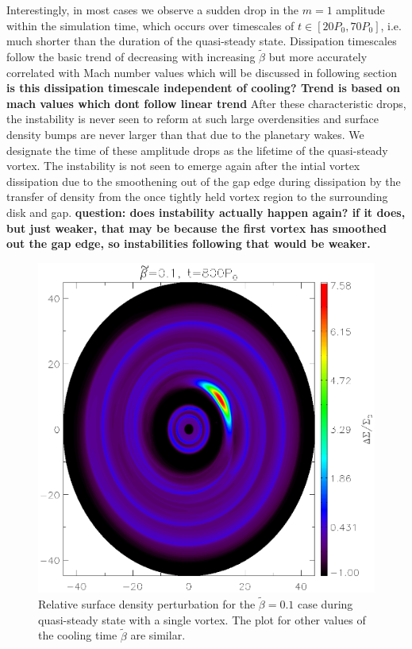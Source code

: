 Interestingly, in most cases we observe a sudden drop in 
the $m=1$ amplitude within the simulation time, which occurs over
timescales of $t\in[20P_0,70P_0]$, i.e. much shorter than the duration of the
quasi-steady state. Dissipation timescales follow the basic trend of decreasing with increasing $\tilde\beta$ but more accurately correlated with Mach number values which will be discussed in following section
{\bf is this dissipation timescale independent of cooling? Trend is based on mach values which dont follow linear trend } 
After these characteristic drops, the instability is never seen to
reform at such large overdensities and surface density bumps are never larger
than that due to the planetary wakes. We designate the time of these
amplitude drops as the lifetime 
of the quasi-steady vortex.
The instability is not seen to emerge again after the intial vortex dissipation
 due to the smoothening out of the gap edge during dissipation by the
 transfer of density from the once tightly held vortex region to the surrounding
 disk and gap.  
{\bf question: does instability
  actually happen again? if it does, but just weaker, that may be
  because the first vortex has smoothed out the gap edge, so
  instabilities following that would be weaker.}



\begin{figure}
  \includegraphics[width=\linewidth,height=\linewidth]{figures/vortex2D}
  \caption{Relative surface density perturbation for the
    $\tilde\beta=0.1$ case during quasi-steady state with a single
    vortex. The plot for other values of the cooling time $\tilde{\beta}$ are
    similar.%
    \label{Vortex2D}} 
\end{figure}

